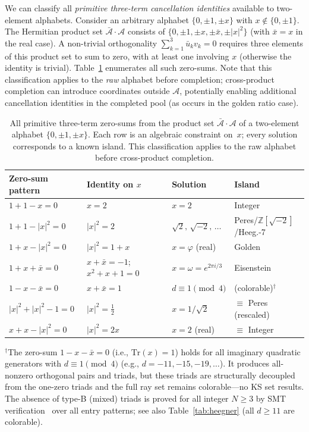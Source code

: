 \documentclass[12pt,a4paper]{article}
\newcommand{\Z}{\mathbb{Z}}
\begin{document}
We can classify all \emph{primitive three-term cancellation identities} available to two-element alphabets.  Consider an arbitrary alphabet $\{0, \pm 1, \pm x\}$ with $x \notin \{0, \pm 1\}$.  The Hermitian product set $\bar{\mathcal{A}} \cdot \mathcal{A}$ consists of $\{0, \pm 1, \pm x, \pm \bar{x}, \pm |x|^2\}$ (with $\bar{x} = x$ in the real case).  A non-trivial orthogonality $\sum_{k=1}^3 \bar{u}_k v_k = 0$ requires three elements of this product set to sum to zero, with at least one involving $x$ (otherwise the identity is trivial).  Table~\ref{tab:two-element} enumerates all such zero-sums.  Note that this classification applies to the \emph{raw} alphabet before completion; cross-product completion can introduce coordinates outside $\mathcal{A}$, potentially enabling additional cancellation identities in the completed pool (as occurs in the golden ratio case).

\begin{table}[h]
\centering
\caption{All primitive three-term zero-sums from the product set $\bar{\mathcal{A}} \cdot \mathcal{A}$ of a two-element alphabet $\{0, \pm 1, \pm x\}$. Each row is an algebraic constraint on~$x$; every solution corresponds to a known island. This classification applies to the raw alphabet before cross-product completion.}
\label{tab:two-element}
\footnotesize
\setlength{\tabcolsep}{3pt}
\begin{tabular}{@{}llll@{}}
\toprule
Zero-sum pattern & Identity on $x$ & Solution & Island \\
\midrule
$1 + 1 - x = 0$ & $x = 2$ & $x = 2$ & Integer \\
$1 + 1 - |x|^2 = 0$ & $|x|^2 = 2$ & $\sqrt{2},\, \sqrt{-2},\, \ldots$ & Peres/$\Z[\!\sqrt{-2}]$/Heeg.-7 \\
$1 + x - |x|^2 = 0$ & $|x|^2 = 1 + x$ & $x = \varphi$ (real) & Golden \\
$1 + x + \bar{x} = 0$ & $x + \bar{x} = -1$; $x^2{+}x{+}1{=}0$ & $x = \omega = e^{2\pi i/3}$ & Eisenstein \\
$1 - x - \bar{x} = 0$ & $x + \bar{x} = 1$ & $d \equiv 1 \pmod{4}$ & (colorable)$^\dagger$ \\
$|x|^2 + |x|^2 - 1 = 0$ & $|x|^2 = \tfrac{1}{2}$ & $x = 1/\sqrt{2}$ & $\equiv$ Peres (rescaled) \\
$x + x - |x|^2 = 0$ & $|x|^2 = 2x$ & $x = 2$ (real) & $\equiv$ Integer \\
\bottomrule
\end{tabular}

\noindent $^\dagger$The zero-sum $1 - x - \bar{x} = 0$ (i.e., $\mathrm{Tr}(x) = 1$) holds for all imaginary quadratic generators with $d \equiv 1 \pmod{4}$ (e.g., $d = -11, -15, -19, \ldots$).  It produces all-nonzero orthogonal pairs and triads, but these triads are structurally decoupled from the one-zero triads and the full ray set remains colorable---no KS set results.  The absence of type-B (mixed) triads is proved for all integer $N \geq 3$ by SMT verification~\cite{deMouraBjorner2008} over all entry patterns; see also Table~\ref{tab:heegner} (all $d \geq 11$ are colorable).
\end{table}
\end{document}
